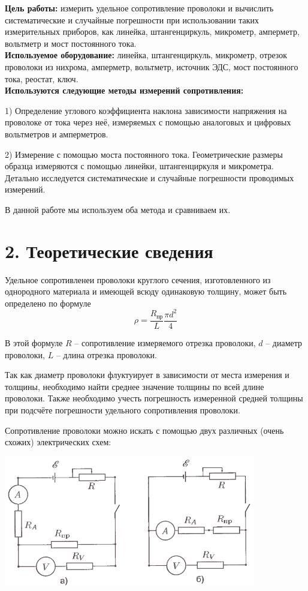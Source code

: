 \textbf{Цель работы:} измерить удельное сопротивление проволоки и вычислить систематические и случайные погрешности при использовании таких измерительных приборов, как линейка, штангенциркуль, микрометр, амперметр, вольтметр и мост постоянного тока.\\

\textbf{Используемое оборудование:} линейка, штангенциркуль, микрометр, отрезок проволоки из нихрома, амперметр, вольтметр, источник ЭДС, мост постоянного тока, реостат, ключ.\\

\textbf{Используются следующие методы измерений сопротивления:} 

1) Определение углового коэффициента наклона зависимости напряжения на проволоке от тока через неё, измеряемых с помощью аналоговых и цифровых вольтметров и амперметров.

2) Измерение с помощью моста постоянного тока. Геометрические размеры образца измеряются с помощью линейки, штангенциркуля и микрометра. Детально исследуется систематические и случайные погрешности проводимых измерений.

В данной работе мы используем оба метода и сравниваем их.\\


\section*{2. Теоретические сведения}

Удельное сопротивленеи проволоки круглого сечения, изготовленного из однородного материала и имеющей всюду одинаковую толщину, может быть определено по формуле
\[\rho = \frac{R_{\text{пр}}}{L} \frac{\pi d^2}{4}\]

В этой формуле $R$ -- сопротивление измеряемого отрезка проволоки, $d$ -- диаметр проволоки, $L$ -- длина отрезка проволоки.

Так как диаметр проволоки флуктуирует в зависимости от места измерения и толщины, необходимо найти среднее значение толщины по всей длине проволоки. Также необходимо учесть погрешность измеренной средней толщины при подсчёте погрешности удельного сопротивления проволоки.

Сопротивление проволоки можно искать с помощью двух различных (очень схожих) электрических схем:
\begin{center}
    {\includegraphics[width=11cm]{1}}
\end{center}

